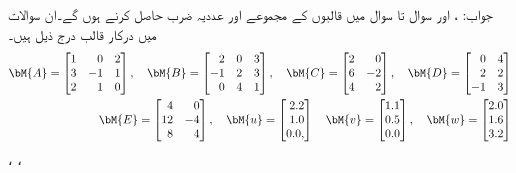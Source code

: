 جواب: ،  اور 
سوال  تا سوال  میں قالبوں کے مجموعے اور عددیہ ضرب حاصل کرنے ہوں گے۔ان سوالات میں درکار قالب درج ذیل ہیں۔
\begin{align*}
\bM{A}=
\begin{bmatrix*}[r]
1&0&2\\
3&-1&1\\
2&1&0
\end{bmatrix*},\quad \bM{B}=
\begin{bmatrix*}[r]
2&0&3\\
-1&2&3\\
0&4&1
\end{bmatrix*},\quad
\bM{C}=
\begin{bmatrix*}[r]
2&0\\
6&-2\\
4&2
\end{bmatrix*},\quad
\bM{D}=
\begin{bmatrix*}[r]
0&4\\
2&2\\
-1&3
\end{bmatrix*}\\
\bM{E}=
\begin{bmatrix*}[r]
4&0\\
12&-4\\
8&4
\end{bmatrix*},\quad
\bM{u}=
\begin{bmatrix*}[r]
2.2\\
1.0\\
0.0,
\end{bmatrix*}\quad
\bM{v}=
\begin{bmatrix*}[r]
1.1\\
0.5\\
0.0
\end{bmatrix*},\quad
\bM{w}=
\begin{bmatrix*}[r]
2.0\\
1.6\\
3.2
\end{bmatrix*}
\end{align*}
، ، 

